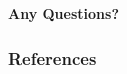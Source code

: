 \documentclass[english,hangout]{beamer}
\begin{document}
\begin{frame}
	\begin{center}
		\textbf{Any Questions?}
	\end{center}
\end{frame}

\begin{frame}
	\frametitle{References}
	
\end{frame}


%
% 
%
%
%
%
%
%
%
%
\end{document}
